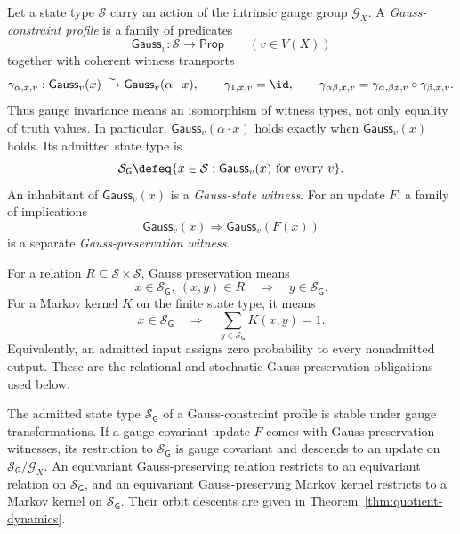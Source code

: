 \begin{definition}
Let a state type $\mathcal S$ carry an action of the intrinsic gauge
group $\mathscr G_X$.  A \emph{Gauss-constraint profile} is a family of
predicates
\[
 \mathsf{Gauss}_v:\mathcal S\longrightarrow\mathsf{Prop}
 \qquad(v\in V(X))
\]
together with coherent witness transports
\[
 \gamma_{\alpha,x,v}:\mathsf{Gauss}_v(x)
   \xrightarrow{\sim}\mathsf{Gauss}_v(\alpha\cdot x),
 \qquad
 \gamma_{1,x,v}=\id,
 \qquad
 \gamma_{\alpha\beta,x,v}
 =\gamma_{\alpha,\beta x,v}\circ\gamma_{\beta,x,v}.
\]
Thus gauge invariance means an isomorphism of witness types, not only equality
of truth values.  In particular,
$\mathsf{Gauss}_v(\alpha\cdot x)$ holds exactly when
$\mathsf{Gauss}_v(x)$ holds.  Its admitted state type is
\[
 \mathcal S_{\mathsf G}
 \defeq
 \{x\in\mathcal S:\mathsf{Gauss}_v(x)\text{ for every }v\}.
\]
An inhabitant of $\mathsf{Gauss}_v(x)$ is a \emph{Gauss-state witness}.  For an
update $F$, a family of implications
\[
 \mathsf{Gauss}_v(x)\Longrightarrow\mathsf{Gauss}_v(F(x))
\]
is a separate \emph{Gauss-preservation witness}.

For a relation $R\subseteq\mathcal S\times\mathcal S$, Gauss preservation
means
\[
 x\in\mathcal S_{\mathsf G},\ (x,y)\in R
 \quad\Longrightarrow\quad y\in\mathcal S_{\mathsf G}.
\]
For a Markov kernel $K$ on the finite state type, it means
\[
 x\in\mathcal S_{\mathsf G}
 \quad\Longrightarrow\quad
 \sum_{y\in\mathcal S_{\mathsf G}}K(x,y)=1.
\]
Equivalently, an admitted input assigns zero probability to every
nonadmitted output.  These are the relational and stochastic
Gauss-preservation obligations used below.
\end{definition}

\begin{proposition}
\label{prop:gauss-constraint}
The admitted state type $\mathcal S_{\mathsf G}$ of a Gauss-constraint profile
is stable under gauge transformations.  If a gauge-covariant update $F$
comes with Gauss-preservation witnesses, its restriction to
$\mathcal S_{\mathsf G}$ is gauge covariant and descends to an update on
$\mathcal S_{\mathsf G}/\mathscr G_X$.  An equivariant Gauss-preserving
relation restricts to an equivariant relation on
$\mathcal S_{\mathsf G}$, and an equivariant Gauss-preserving Markov kernel
restricts to a Markov kernel on $\mathcal S_{\mathsf G}$.  Their orbit
descents are given in Theorem~\ref{thm:quotient-dynamics}.
\end{proposition}

